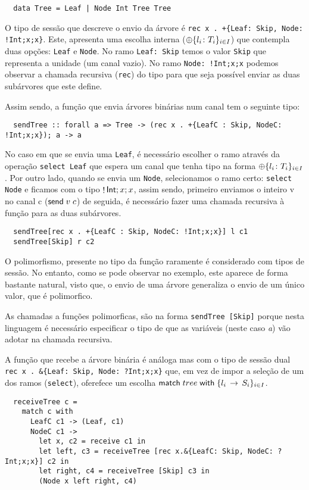 \begin{lstlisting}
  data Tree = Leaf | Node Int Tree Tree
\end{lstlisting}

O tipo de sessão que descreve o envio da árvore é \lstinline"rec x . +{Leaf: Skip, Node: !Int;x;x}". Este, apresenta uma escolha interna ($\oplus\{l_i\colon T_i\}_{i\in I}$) que contempla duas opções: \lstinline"Leaf" e \lstinline"Node". No ramo \lstinline"Leaf: Skip" temos o valor \lstinline"Skip" que representa a unidade (um canal vazio). No ramo \lstinline"Node: !Int;x;x" podemos observar a chamada recursiva (\lstinline"rec") do tipo para que seja possível enviar as duas subárvores que este define.

Assim sendo, a função que envia árvores binárias num canal tem o seguinte tipo:

\begin{lstlisting}
  sendTree :: forall a => Tree -> (rec x . +{LeafC : Skip, NodeC: !Int;x;x}); a -> a
\end{lstlisting}


No caso em que se envia uma \lstinline"Leaf", é necessário escolher o ramo através da operação \lstinline"select Leaf" que espera um canal que tenha tipo na forma $\oplus\{l_i\colon T_i\}_{i\in I}$.
Por outro lado, quando se envia um \lstinline"Node", selecionamos o ramo certo: \lstinline"select Node" e ficamos com o tipo $\mathop!\mathsf{Int};x;x$, assim sendo, primeiro enviamos o inteiro v no canal c ($\mathsf{send}\;v\; c$) de seguida, é necessário fazer uma chamada recursiva à função para as duas subárvores.

\begin{lstlisting}
  sendTree[rec x . +{LeafC : Skip, NodeC: !Int;x;x}] l c1
  sendTree[Skip] r c2
\end{lstlisting}

O polimorfismo, presente no tipo da função raramente é considerado com tipos de sessão. No entanto, como se pode observar no exemplo, este aparece de forma bastante natural, visto que, o envio de uma árvore generaliza o envio de um único valor, que é polimorfico.

As chamadas a funções polimorficas, são na forma \lstinline"sendTree [Skip]" porque nesta linguagem é necessário especificar o tipo de que as variáveis (neste caso \textit{a}) vão adotar na chamada recursiva.

A função que recebe a árvore binária é análoga mas com o tipo de sessão dual \lstinline"rec x . &{Leaf: Skip, Node: ?Int;x;x}" que, em vez de impor a seleção de um dos ramos (\lstinline"select"), oferefece um escolha $\mathsf{match}\;tree\;\mathsf{with}\;\{l_i\,\to\,S_i\}_{i\in I}$.
\begin{lstlisting}  
  receiveTree c =
    match c with
      LeafC c1 -> (Leaf, c1)
      NodeC c1 ->
        let x, c2 = receive c1 in
        let left, c3 = receiveTree [rec x.&{LeafC: Skip, NodeC: ?Int;x;x}] c2 in
        let right, c4 = receiveTree [Skip] c3 in
        (Node x left right, c4)
\end{lstlisting}


